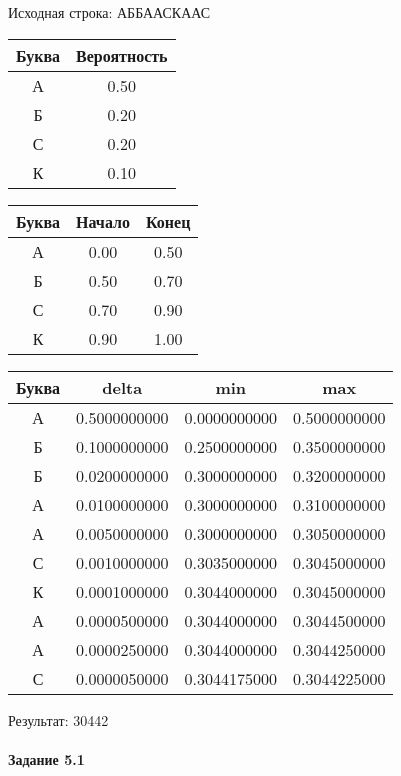 \documentclass[a4paper, 12pt]{article}
\begin{document}
Исходная строка: АББААСКААС\
\begin{center}
 \begin{tabular}{ |c|c| } 
  \hline
     Буква & Вероятность \\ \hline
А & 0.50\\\hline
Б & 0.20\\\hline
С & 0.20\\\hline
К & 0.10
\\ \hline \end{tabular}
\end{center}
\begin{center}
 \begin{tabular}{ |c|c|c| } 
  \hline
     Буква & Начало & Конец \\ \hline
А & 0.00 & 0.50\\\hline
Б & 0.50 & 0.70\\\hline
С & 0.70 & 0.90\\\hline
К & 0.90 & 1.00
\\ \hline \end{tabular}
\end{center}
\begin{center}
 \begin{tabular}{ |c|c|c|c| } 
  \hline
     Буква & delta & min & max \\ \hline
А & 0.5000000000 & 0.0000000000 & 0.5000000000\\\hline
Б & 0.1000000000 & 0.2500000000 & 0.3500000000\\\hline
Б & 0.0200000000 & 0.3000000000 & 0.3200000000\\\hline
А & 0.0100000000 & 0.3000000000 & 0.3100000000\\\hline
А & 0.0050000000 & 0.3000000000 & 0.3050000000\\\hline
С & 0.0010000000 & 0.3035000000 & 0.3045000000\\\hline
К & 0.0001000000 & 0.3044000000 & 0.3045000000\\\hline
А & 0.0000500000 & 0.3044000000 & 0.3044500000\\\hline
А & 0.0000250000 & 0.3044000000 & 0.3044250000\\\hline
С & 0.0000050000 & 0.3044175000 & 0.3044225000
\\ \hline \end{tabular}
\end{center}
Результат: 30442
\pagebreak
\paragraph{Задание 5.1 \\
}
\end{document}
